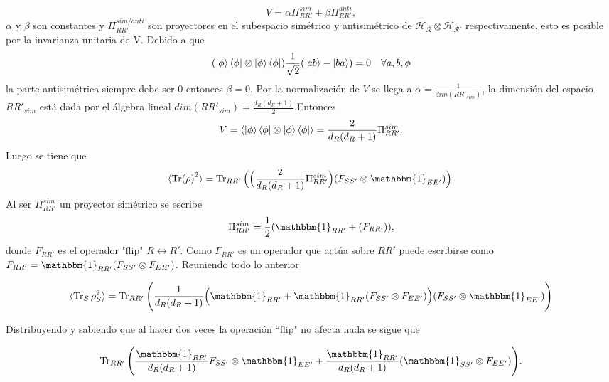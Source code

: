 \begin{equation}
V= \alpha \Pi_{RR'}^{sim} + \beta \Pi_{RR'}^{anti},
\end{equation}
$\alpha$ y $\beta$ son constantes y $\Pi_{RR'}^{sim/anti}$ son proyectores en el subespacio simétrico y antisimétrico de $\mathcal{H_{R} \otimes H_{R'}}$ respectivamente, esto es posible por la invarianza unitaria de V. Debido a que 	
\begin{equation}
(\ket{\phi} \bra{\phi} \otimes \ket{\phi} \bra{\phi})\frac{1}{\sqrt{2}} ( \ket{ab} -\ket{ba})=0  \quad  \forall a,b,\phi
\end{equation}
la parte antisimétrica siempre debe ser 0 entonces $\beta=0$. Por la normalización de $V$ se llega a $\alpha= \frac{1}{dim(RR'_{sim})}$, la dimensión del espacio $RR'_{sim}$ está dada por el álgebra lineal $dim(RR'_{sim})= \frac{d_{R}(d_{R}+1)}{2}$.Entonces
\begin{equation}
V= \langle \ket{\phi} \bra{\phi} \otimes \ket{\phi} \bra{\phi} \rangle = \frac{2}{d_{R}(d_{R} +1)} \Pi_{RR'}^{sim}.
\end{equation}
Luego se tiene que 
\begin{equation}
\langle \Tr (\rho)^{2} \rangle = \Tr_{RR'} \Big( \Big( \frac{2}{d_{R}(d_{R} +1)} \Pi_{RR'}^{sim} \Big)(F_{SS'} \otimes \mathbbm{1}_{EE'}) \Big).
\end{equation}
Al ser $\Pi_{RR'}^{sim}$ un proyector simétrico se escribe
\begin{equation}
\Pi_{RR'}^{sim}=\frac{1}{2}(\mathbbm{1}_{RR'}+(F_{RR'} )),
\end{equation}
donde $F_{RR'}$ es el operador "flip"  $R \longleftrightarrow R'$. Como $F_{RR'}$ es un operador que actúa sobre $RR'$ puede escribirse como $F_{RR'}= \mathbbm{1}_{RR'}(F_{SS'} \otimes F_{EE'})$. Reuniendo todo lo anterior

\begin{equation}
\langle \Tr_{S} \rho_{S}^2 \rangle = \Tr_{RR'} \Bigg( \frac{1}{d_{R}(d_{R}+1)} \Big( \mathbbm{1}_{RR'}+\mathbbm{1}_{RR'}(F_{SS'} \otimes F_{EE'}) \Big)  (F_{SS'}\otimes \mathbbm{1}_{EE'})   \Bigg)
\end{equation}

Distribuyendo y sabiendo que al hacer dos veces la operación ``flip" no afecta nada se sigue que

\begin{equation}
\Tr_{RR'} \Bigg( \frac{\mathbbm{1}_{RR'}}{d_{R}(d_{R}+1)} F_{SS'} \otimes \mathbbm{1}_{EE'} + \frac{\mathbbm{1}_{RR'}}{d_{R}(d_{R}+1)} (\mathbbm{1}_{SS'} \otimes F_{EE'})  \Bigg).
\end{equation}

